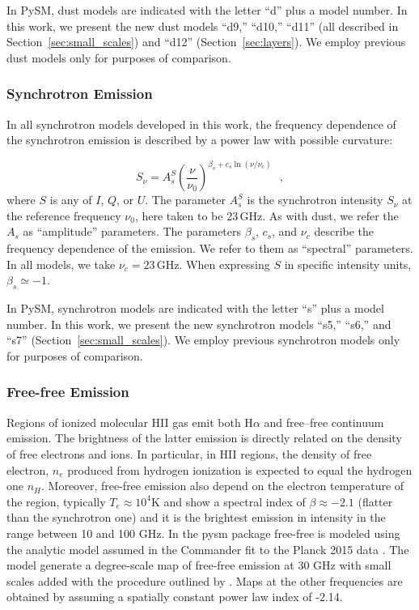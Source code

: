 \documentclass[twocolumn]{aastex631}
\begin{document}
In PySM, dust models are indicated with the letter ``d'' plus a model number. In this work, we present the new dust models ``d9,'' ``d10,'' ``d11'' (all described in Section~\ref{sec:small_scales}) and ``d12'' (Section~\ref{sec:layers}). We employ previous dust models only for purposes of comparison.

\subsubsection{Synchrotron Emission}
In all synchrotron models developed in this work, the frequency dependence of the synchrotron emission is described by a power law with possible curvature:

\begin{equation} \label{eq:dust-emission-law}
    S_\nu = A_s^S \left(\frac{\nu}{\nu_0}\right)^{\beta_s + c_s \ln\left(\nu/\nu_c\right)}
    ~~~,
\end{equation}
where $S$ is any of $I$, $Q$, or $U$. The parameter $A_s^S$ is the synchrotron intensity $S_\nu$ at the reference frequency $\nu_0$, here taken to be 23\,GHz. As with dust, we refer the $A_s$ as ``amplitude'' parameters. The parameters $\beta_s$, $c_s$, and $\nu_c$ describe the frequency dependence of the emission. We refer to them as ``spectral'' parameters. In all models, we take $\nu_c = 23$\,GHz. When expressing $S$ in specific intensity units, $\beta_s \simeq -1$.

In PySM, synchrotron models are indicated with the letter ``s'' plus a model number. In this work, we present the new synchrotron models ``s5,'' ``s6,'' and ``s7'' (Section~\ref{sec:small_scales}). We employ previous synchrotron models only for purposes of comparison.

\subsubsection{Free-free Emission}
Regions  of ionized molecular  HII gas emit both H$\alpha$ and free–free continuum emission.  The brightness of the latter  emission is directly related  on the density of free electrons and ions. In particular, in HII regions, the density of free electron, $n_e$  produced from hydrogen ionization  is  expected to equal the hydrogen one  $n_H$. Moreover, free-free emission also   depend on the electron temperature of the region,  typically $T_e \approx 10^4$K and show a spectral index of $\beta\approx -2.1$ (flatter than the synchrotron one) and it is the brightest emission in intensity in the range between 10 and 100 GHz.
In the pysm package  free-free is modeled  using the analytic model assumed in the Commander fit to the Planck 2015 data \citep{Draine:2011}. The model generate a degree-scale map of free-free emission at 30 GHz with small scales added with the procedure outlined by \citet{Thorne:2017}. Maps at the other frequencies are obtained by assuming a spatially constant power law index of -2.14.
\end{document}

